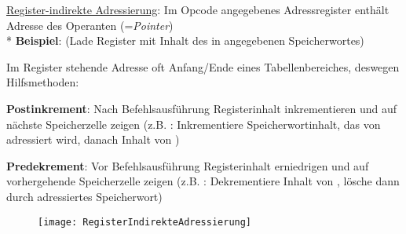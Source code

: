 \begin{items}
	\item \underline{Register-indirekte Adressierung}: Im Opcode angegebenes Adressregister enthält Adresse des Operanten (=\emph{Pointer}) \\* \textbf{Beispiel}:  (Lade Register  mit Inhalt des in  angegebenen Speicherwortes)
	\begin{items}
		\item Im Register stehende Adresse oft Anfang/Ende eines Tabellenbereiches, deswegen Hilfsmethoden:
		\item \textbf{Postinkrement}: Nach Befehlsausführung Registerinhalt inkrementieren und auf nächste Speicherzelle zeigen (z.B. : Inkrementiere Speicherwortinhalt, das von  adressiert wird, danach Inhalt von )
		\item \textbf{Predekrement}: Vor Befehlsausführung Registerinhalt erniedrigen und auf vorhergehende Speicherzelle zeigen (z.B. : Dekrementiere Inhalt von , lösche dann durch  adressiertes Speicherwort)
	\end{items}
		\begin{figure}[ht]
		  \centering
		  \texttt{[image: RegisterIndirekteAdressierung]}
		  \label{RegisterIndirekteAdressierung}
		\end{figure}


\end{items}
